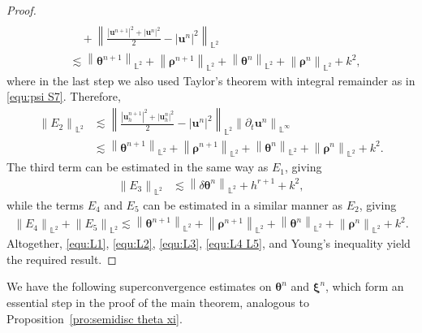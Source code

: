 \documentclass[11pt, reqno]{amsart}
\theoremstyle{definition}
\theoremstyle{remark}
\numberwithin{equation}{section}
\newcommand{\bff}{\boldsymbol}
\newcommand{\bb}{\mathbb}
\newcommand{\norm}[2]{\left\|{#1}\right\|_{#2}}
\newcommand{\abs}[1]{\left|{#1}\right|}
\begin{document}
\begin{proof}
\begin{align*}
	\\
	&\quad
	+
	\norm{\frac{\abs{\bff{u}^{n+1}}^2+\abs{\bff{u}^n}^2}{2} - \abs{\bff{u}^n}^2}{\bb{L}^2}
	\\
	&\lesssim
	\norm{\bff{\theta}^{n+1}}{\bb{L}^2} + \norm{\bff{\rho}^{n+1}}{\bb{L}^2} + \norm{\bff{\theta}^n}{\bb{L}^2} + \norm{\bff{\rho}^n}{\bb{L}^2} + k^2,
\end{align*}
where in the last step we also used Taylor's theorem with integral remainder as in \eqref{equ:psi S7}. Therefore,
\begin{align}\label{equ:L2}
	\nonumber
	\norm{E_2}{\bb{L}^2}
	&\lesssim
	\norm{\frac{\abs{\bff{u}_h^{n+1}}^2+\abs{\bff{u}_h^n}^2}{2} - \abs{\bff{u}^n}^2}{\bb{L}^2} 
	\norm{\partial_t \bff{u}^n}{\bb{L}^\infty}
	\\
	&\lesssim
	\norm{\bff{\theta}^{n+1}}{\bb{L}^2} + \norm{\bff{\rho}^{n+1}}{\bb{L}^2} + \norm{\bff{\theta}^n}{\bb{L}^2} + \norm{\bff{\rho}^n}{\bb{L}^2} + k^2.
\end{align}
The third term can be estimated in the same way as $E_1$, giving
\begin{align}\label{equ:L3}
	\norm{E_3}{\bb{L}^2}
	&\lesssim
	\norm{\delta \bff{\theta}^n}{\bb{L}^2} + h^{r+1} + k^2,
\end{align}
while the terms $E_4$ and $E_5$ can be estimated in a similar manner as $E_2$, giving
\begin{align}\label{equ:L4 L5}
	\norm{E_4}{\bb{L}^2} + \norm{E_5}{\bb{L}^2}
	\lesssim
	\norm{\bff{\theta}^{n+1}}{\bb{L}^2} + \norm{\bff{\rho}^{n+1}}{\bb{L}^2} + \norm{\bff{\theta}^n}{\bb{L}^2} + \norm{\bff{\rho}^n}{\bb{L}^2} + k^2.
\end{align}
Altogether, \eqref{equ:L1}, \eqref{equ:L2}, \eqref{equ:L3}, \eqref{equ:L4 L5}, and Young's inequality yield the required result.
\end{proof}

We have the following superconvergence estimates on $\bff{\theta}^n$ and $\bff{\xi}^n$, which form an essential step in the proof of the main theorem, analogous to Proposition~\ref{pro:semidisc theta xi}.
\end{document}
